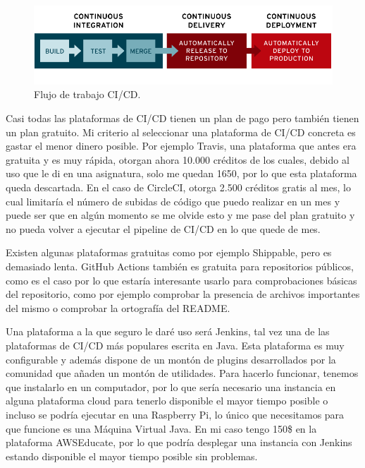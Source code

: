 \begin{figure}[h]
	\includegraphics[scale=0.4]{imagenes/03_Estado_del_arte/ci-cd-flow.png}
	\centering
	\caption{Flujo de trabajo CI/CD. \cite{cicd}}
\end{figure}

Casi todas las plataformas de CI/CD tienen un plan de pago pero también tienen un plan gratuito. Mi criterio al seleccionar una plataforma de CI/CD concreta es gastar el menor dinero posible. Por ejemplo Travis, una plataforma que antes era gratuita y es muy rápida, otorgan ahora 10.000 créditos de los cuales, debido al uso que le di en una asignatura, solo me quedan 1650, por lo que esta plataforma queda descartada. En el caso de CircleCI, otorga 2.500 créditos gratis al mes, lo cual limitaría el número de subidas de código que puedo realizar en un mes y puede ser que en algún momento se me olvide esto y me pase del plan gratuito y no pueda volver a ejecutar el pipeline de CI/CD en lo que quede de mes.\newline

Existen algunas plataformas gratuitas como por ejemplo Shippable, pero es demasiado lenta. GitHub Actions también es gratuita para repositorios públicos, como es el caso por lo que estaría interesante usarlo para comprobaciones básicas del repositorio, como por ejemplo comprobar la presencia de archivos importantes del mismo o comprobar la ortografía del README.\newline

Una plataforma a la que seguro le daré uso será Jenkins, tal vez una de las plataformas de CI/CD más populares escrita en Java. Esta plataforma es muy configurable y además dispone de un montón de plugins desarrollados por la comunidad que añaden un montón de utilidades. Para hacerlo funcionar, tenemos que instalarlo en un computador, por lo que sería necesario una instancia en alguna plataforma cloud para tenerlo disponible el mayor tiempo posible o incluso se podría ejecutar en una Raspberry Pi, lo único que necesitamos para que funcione es una Máquina Virtual Java. En mi caso tengo 150\$ en la plataforma AWSEducate, por lo que podría desplegar una instancia con Jenkins estando disponible el mayor tiempo posible sin problemas.\newline

